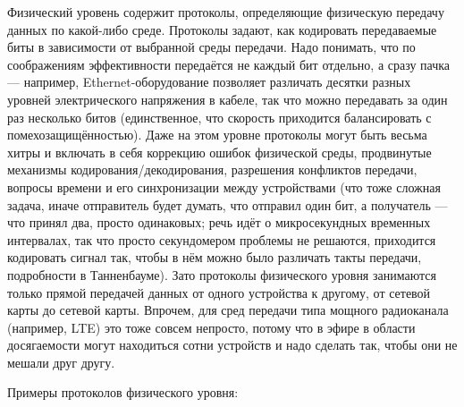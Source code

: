 \documentclass{../../text-style}
\begin{document}
Физический уровень содержит протоколы, определяющие физическую передачу данных по какой-либо среде. Протоколы задают, как кодировать передаваемые биты в зависимости от выбранной среды передачи. Надо понимать, что по соображениям эффективности передаётся не каждый бит отдельно, а сразу пачка --- например, Ethernet-оборудование позволяет различать десятки разных уровней электрического напряжения в кабеле, так что можно передавать за один раз несколько битов (единственное, что скорость приходится балансировать с помехозащищённостью). Даже на этом уровне протоколы могут быть весьма хитры и включать в себя коррекцию ошибок физической среды, продвинутые механизмы кодирования/декодирования, разрешения конфликтов передачи, вопросы времени и его синхронизации между устройствами (что тоже сложная задача, иначе отправитель будет думать, что отправил один бит, а получатель --- что принял два, просто одинаковых; речь идёт о микросекундных временных интервалах, так что просто секундомером проблемы не решаются, приходится кодировать сигнал так, чтобы в нём можно было различать такты передачи, подробности в Танненбауме). Зато протоколы физического уровня занимаются только прямой передачей данных от одного устройства к другому, от сетевой карты до сетевой карты. Впрочем, для сред передачи типа мощного радиоканала (например, LTE) это тоже совсем непросто, потому что в эфире в области досягаемости могут находиться сотни устройств и надо сделать так, чтобы они не мешали друг другу.

Примеры протоколов физического уровня:
\end{document}
